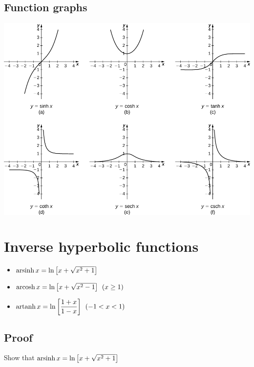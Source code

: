 \subsection{Function graphs}
\includegraphics[width=\linewidth]{images/hyperbolic_graphs}

\section{Inverse hyperbolic functions}
\begin{itemize}
    \item $\operatorname{arsinh} x = \ln \left[x+\sqrt{x^2+1}\right]$
    \item $\operatorname{arcosh} x = \ln \left[x+\sqrt{x^2-1}\right] \:\: (x \geq 1)$
    \item $\operatorname{artanh} x = \ln \left[\dfrac{1+x}{1-x}\right] \:\: (-1 < x < 1)$
\end{itemize}

\subsection{Proof}
\begin{example}
    Show that $\operatorname{arsinh} x = \ln \left[x+\sqrt{x^2+1}\right]$
\end{example}

